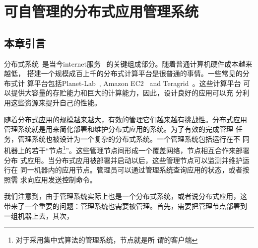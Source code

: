 \chapter{可自管理的分布式应用管理系统}
\label{chap:selfman}


%
%
%
%
%
%
%
%
%
%
%
%

\section{本章引言}

分布式系统~\cite{Ghemawat2003,DeCandia2007}是当今internet服务~
\cite{google, amazon?}的关键组成部分。随着普通计算机硬件成本越来越低，
搭建一个规模成百上千的分布式计算平台是很普通的事情。一些常见的分布式计
算平台包括Planet-Lab~\cite{Bavier2004}, Amazon
EC2~\cite{Garfinkel2007} and Teragrid~\cite{Catlett2002}。这些计算平台
可以提供大容量的存贮能力和巨大的计算能力，因此，设计良好的应用可以充
分利用这些资源来提升自己的性能。

随着分布式应用的规模越来越大，有效的管理它们越来越有挑战性。分布式应用
管理系统就是用来简化部署和维护分布式应用的系统。为了有效的完成管理
任务，管理系统也被设计为一个复杂的分布式系统。一个管理系统包括运行在不
同机器上的若干“节点\footnote{对于采用集中式算法的管理系统，节点就是所
谓的客户端}”。这些管理节点间形成一个覆盖网络，节点相互合作来部署分布
式应用。当分布式应用被部署并启动以后，这些管理节点可以监测并维护运行在
同一机器内的应用节点。管理员可以通过管理系统查询应用的状态，或者按照需
求向应用发送控制命令。

我们注意到，由于管理系统实际上也是一个分布式系统，或者说分布式应用，这
带来了一个重要的问题：管理系统也需要被管理。首先，需要把管理节点部署到
一组机器上去，其次，

